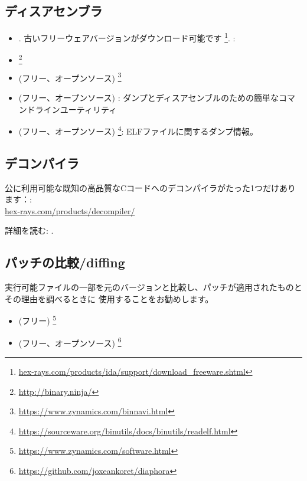 \subsection{ディスアセンブラ}


\begin{itemize}
\item {}. 古いフリーウェアバージョンがダウンロード可能です
\footnote{\href{http://go.yurichev.com/17031}{hex-rays.com/products/ida/support/download\_freeware.shtml}}.
\ShortHotKeyCheatsheet: 

\item {}\footnote{\url{http://binary.ninja/}}

\item (フリー、オープンソース) \footnote{\url{https://www.zynamics.com/binnavi.html}}

\item (フリー、オープンソース) : ダンプとディスアセンブルのための簡単なコマンドラインユーティリティ

\item (フリー、オープンソース) \footnote{\url{https://sourceware.org/binutils/docs/binutils/readelf.html}}:
ELFファイルに関するダンプ情報。
\end{itemize}

\subsection{デコンパイラ}

公に利用可能な既知の高品質なCコードへのデコンパイラがたった1つだけあります：:\\
\href{http://go.yurichev.com/17033}{hex-rays.com/products/decompiler/}

詳細を読む: .

\subsection{パッチの比較/diffing}

実行可能ファイルの一部を元のバージョンと比較し、パッチが適用されたものとその理由を調べるときに
使用することをお勧めします。

\begin{itemize}
\item (フリー) \footnote{\url{https://www.zynamics.com/software.html}}

\item (フリー、オープンソース) \footnote{\url{https://github.com/joxeankoret/diaphora}}
\end{itemize}

